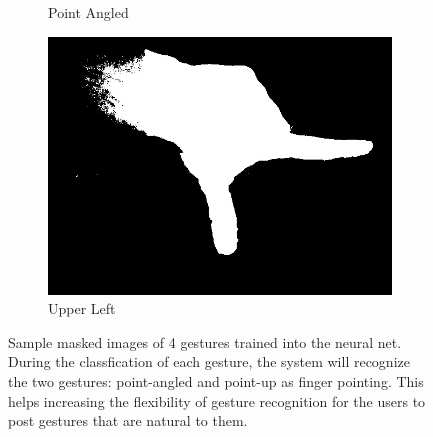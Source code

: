 \begin{figure}
\begin{subfigure}[b]{0.25\columnwidth}
\caption{Point Angled}
\end{subfigure}%
\begin{subfigure}[b]{0.25\columnwidth}
\centering
\includegraphics[width=0.95\columnwidth]{ch5/figs/upper_left_corner.png}
\caption{Upper Left}
\end{subfigure}
\caption{Sample masked images of 4 gestures trained into the neural net.
During the classfication of each gesture, the system will recognize the
two gestures: point-angled and point-up as finger pointing. This helps
increasing the flexibility of gesture recognition for the users to post
gestures that are natural to them.}
\label{gestures}
\end{figure}

